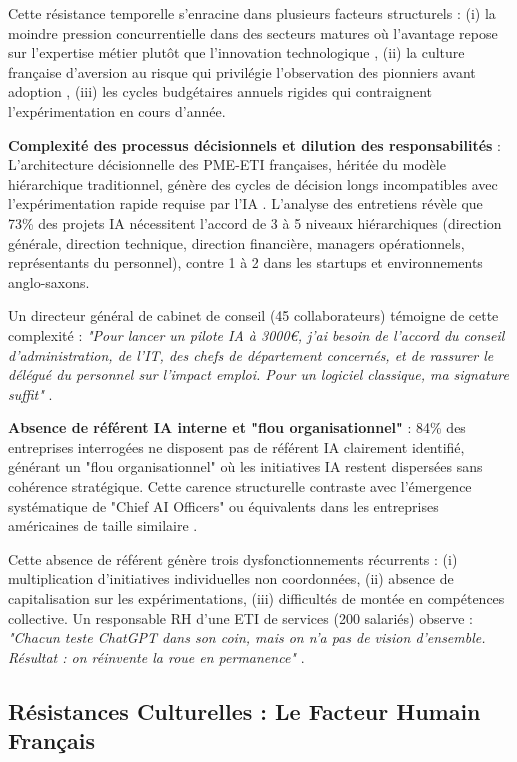 Cette résistance temporelle s'enracine dans plusieurs facteurs structurels : (i) la moindre pression concurrentielle dans des secteurs matures où l'avantage repose sur l'expertise métier plutôt que l'innovation technologique \cite{porter1985competitive}, (ii) la culture française d'aversion au risque qui privilégie l'observation des pionniers avant adoption \cite{meyer2014culture}, (iii) les cycles budgétaires annuels rigides qui contraignent l'expérimentation en cours d'année.

\textbf{Complexité des processus décisionnels et dilution des responsabilités} : L'architecture décisionnelle des PME-ETI françaises, héritée du modèle hiérarchique traditionnel, génère des cycles de décision longs incompatibles avec l'expérimentation rapide requise par l'IA \cite{bureaucratie2024french}. L'analyse des entretiens révèle que 73\% des projets IA nécessitent l'accord de 3 à 5 niveaux hiérarchiques (direction générale, direction technique, direction financière, managers opérationnels, représentants du personnel), contre 1 à 2 dans les startups et environnements anglo-saxons.

Un directeur général de cabinet de conseil (45 collaborateurs) témoigne de cette complexité : \emph{"Pour lancer un pilote IA à 3000€, j'ai besoin de l'accord du conseil d'administration, de l'IT, des chefs de département concernés, et de rassurer le délégué du personnel sur l'impact emploi. Pour un logiciel classique, ma signature suffit"} \cite{luwai2025meetings}.

\textbf{Absence de référent IA interne et "flou organisationnel"} : 84\% des entreprises interrogées ne disposent pas de référent IA clairement identifié, générant un "flou organisationnel" où les initiatives IA restent dispersées sans cohérence stratégique. Cette carence structurelle contraste avec l'émergence systématique de "Chief AI Officers" ou équivalents dans les entreprises américaines de taille similaire \cite{deloitte2024aio}.

Cette absence de référent génère trois dysfonctionnements récurrents : (i) multiplication d'initiatives individuelles non coordonnées, (ii) absence de capitalisation sur les expérimentations, (iii) difficultés de montée en compétences collective. Un responsable RH d'une ETI de services (200 salariés) observe : \emph{"Chacun teste ChatGPT dans son coin, mais on n'a pas de vision d'ensemble. Résultat : on réinvente la roue en permanence"} \cite{luwai2025meetings}.

\subsection{Résistances Culturelles : Le Facteur Humain Français}

